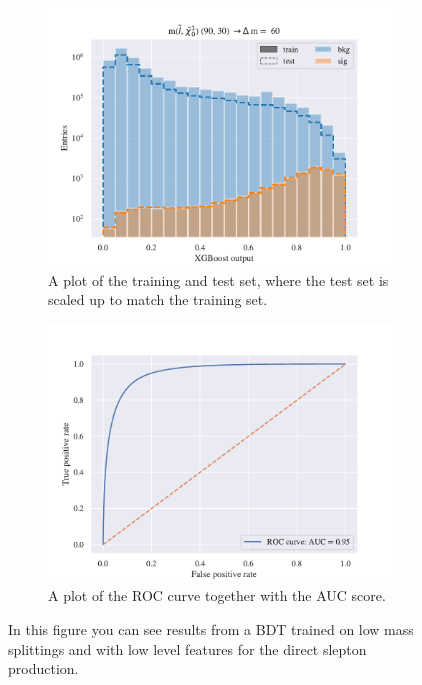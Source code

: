 \begin{figure}[H]
    \centering
    \begin{subfigure}[t!]{0.49\textwidth}
        \includegraphics[width = \textwidth]{Figures/SlepSlep/ML/BDT/Low_level/Low/scaled_train_test_395897.pdf}
        \caption{A plot of the training and test set, where the test set is scaled up to match the training set.}
        \label{fig:traintestscaledExample}
    \end{subfigure}
    \begin{subfigure}[t!]{0.49\textwidth}
        \includegraphics[width = \textwidth]{Figures/SlepSlep/ML/BDT/Low_level/Low/ROCcurve.pdf}
        \caption{A plot of the ROC curve together with the AUC score.}
        \label{fig:ROCExample}
    \end{subfigure}
    \caption{In this figure you can see results from a BDT trained on low mass splittings and with low level features for the direct slepton production.}
    \label{fig:resExample}
\end{figure}

